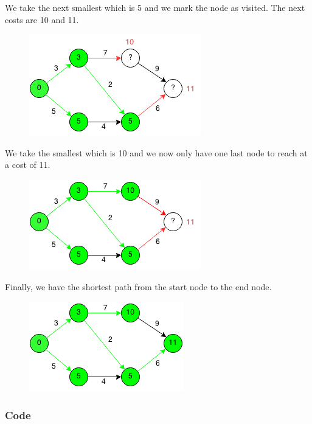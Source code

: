 \documentclass[11pt,oneside]{book}
\makeatletter
\def\maxwidth#1{\ifdim\Gin@nat@width>#1 #1\else\Gin@nat@width\fi}
\makeatother
\begin{document}
We take the next smallest which is 5 and we mark the node as visited. The next costs are 10 and 11.

\vspace{5px}\begin{figure}[H]\centering
        \includegraphics[width=0.66\maxwidth{\textwidth}]{djikstra4.png}
        \end{figure}

We take the smallest which is 10 and we now only have one last node to reach at a cost of 11.

\vspace{5px}\begin{figure}[H]\centering
        \includegraphics[width=0.66\maxwidth{\textwidth}]{djikstra5.png}
        \end{figure}

Finally, we have the shortest path from the start node to the end node.

\vspace{5px}\begin{figure}[H]\centering
        \includegraphics[width=0.66\maxwidth{\textwidth}]{djikstra6.png}
        \end{figure}

\subsubsection{Code}
\end{document}
